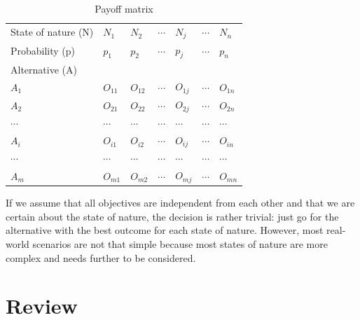 \documentclass[
  12pt,
  oneside]{book}
\theoremstyle{definition}
\theoremstyle{definition}
\theoremstyle{definition}
\theoremstyle{definition}
\theoremstyle{remark}
\begin{document}
\begin{longtable}[]{@{}
  >{\raggedright\arraybackslash}p{}
  >{\raggedright\arraybackslash}p{}
  >{\raggedright\arraybackslash}p{}
  >{\raggedright\arraybackslash}p{}
  >{\raggedright\arraybackslash}p{}
  >{\raggedright\arraybackslash}p{}
  >{\raggedright\arraybackslash}p{}@{}}
\caption{Payoff matrix}\tabularnewline
\toprule\noalign{}
\endfirsthead
\endhead
\bottomrule\noalign{}
\endlastfoot
State of nature (N) & \(N_1\) & \(N_2\) & \(\cdots\) & \(N_j\) & \(\cdots\) & \(N_n\) \\
Probability (p) & \(p_1\) & \(p_2\) & \(\cdots\) & \(p_j\) & \(\cdots\) & \(p_n\) \\
Alternative (A) & & & & & & \\
\(A_1\) & \(O_{11}\) & \(O_{12}\) & \(\cdots\) & \(O_{1j}\) & \(\cdots\) & \(O_{1n}\) \\
\(A_2\) & \(O_{21}\) & \(O_{22}\) & \(\cdots\) & \(O_{2j}\) & \(\cdots\) & \(O_{2n}\) \\
\(\cdots\) & \(\cdots\) & \(\cdots\) & \(\cdots\) & \(\cdots\) & \(\cdots\) & \(\cdots\) \\
\(A_i\) & \(O_{i1}\) & \(O_{i2}\) & \(\cdots\) & \(O_{ij}\) & \(\cdots\) & \(O_{in}\) \\
\(\cdots\) & \(\cdots\) & \(\cdots\) & \(\cdots\) & \(\cdots\) & \(\cdots\) & \(\cdots\) \\
\(A_m\) & \(O_{m1}\) & \(O_{m2}\) & \(\cdots\) & \(O_{mj}\) & \(\cdots\) & \(O_{mn}\) \\
\end{longtable}

If we assume that all objectives are independent from each other and that we are certain about the state of nature, the decision is rather trivial: just go for the alternative with the best outcome for each state of nature. However, most real-world scenarios are not that simple because most states of nature are more complex and needs further to be considered.

\hypertarget{review}{%
\section{Review}\label{review}}
\end{document}
